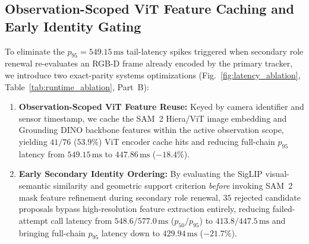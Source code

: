 \documentclass[10pt,journal]{IEEEtran}
\begin{document}
\subsection{Observation-Scoped ViT Feature Caching and Early Identity Gating}
To eliminate the $p_{95} = 549.15\,\mathrm{ms}$ tail-latency spikes triggered when secondary role renewal re-evaluates an RGB-D frame already encoded by the primary tracker, we introduce two exact-parity systems optimizations (Fig.~\ref{fig:latency_ablation}, Table~\ref{tab:runtime_ablation}, Part~B):
\begin{enumerate}
    \item \textbf{Observation-Scoped ViT Feature Reuse:} Keyed by camera identifier and sensor timestamp, we cache the SAM~2 Hiera/ViT image embedding and Grounding DINO backbone features within the active observation scope, yielding $41/76$ ($53.9\%$) ViT encoder cache hits and reducing full-chain $p_{95}$ latency from $549.15\,\mathrm{ms}$ to $447.86\,\mathrm{ms}$ ($-18.4\%$).
    \item \textbf{Early Secondary Identity Ordering:} By evaluating the SigLIP visual-semantic similarity and geometric support criterion \emph{before} invoking SAM~2 mask feature refinement during secondary role renewal, $35$ rejected candidate proposals bypass high-resolution feature extraction entirely, reducing failed-attempt call latency from $548.6 / 577.0\,\mathrm{ms}$ ($p_{50}/p_{95}$) to $413.8 / 447.5\,\mathrm{ms}$ and bringing full-chain $p_{95}$ latency down to $\mathbf{429.94\,\mathrm{ms}}$ ($\mathbf{-21.7\%}$).
\end{enumerate}
\end{document}
